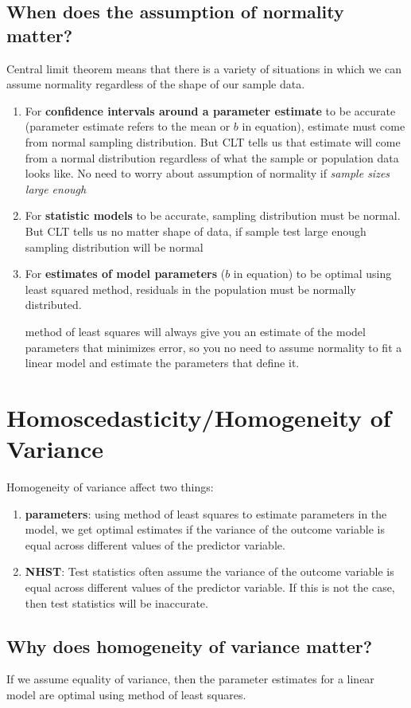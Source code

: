 \subsection{When does the assumption of normality matter?}
Central limit theorem means that there is a variety of situations in which we can assume normality regardless of the shape of our sample data. 
\begin{enumerate}
\item For \textbf{confidence intervals around a parameter estimate} to be accurate (parameter estimate refers to the mean or $b$ in equation), estimate must come from normal sampling distribution. But CLT tells us that estimate will come from a normal distribution regardless of what the sample or population data looks like. No need to worry about assumption of normality if \emph{sample sizes large enough}
\item For \textbf{statistic models} to be accurate, sampling distribution must be normal. But CLT tells us no matter shape of data, if sample test large enough sampling distribution will be normal
\item For \textbf{estimates of model parameters} ($b$ in equation) to be optimal using least squared method, residuals in the population must be normally distributed. 

method of least squares will always give you an estimate of the model parameters that minimizes error, so you no need to assume normality to fit a linear model and estimate the parameters that define it. 
\end{enumerate}

\section{Homoscedasticity/Homogeneity of Variance}
Homogeneity of variance affect two things:
\begin{enumerate}
\item \textbf{parameters}: using method of least squares to estimate parameters in the model, we get optimal estimates if the variance of the outcome variable is equal across different values of the predictor variable. 
\item \textbf{NHST}: Test statistics often assume the variance of the outcome variable is equal across different values of the predictor variable. If this is not the case, then test statistics will be inaccurate.
\end{enumerate}
\subsection{Why does homogeneity of variance matter?}
If we assume equality of variance, then the parameter estimates for a linear model are optimal using method of least squares. 

